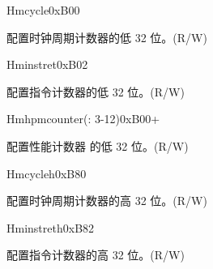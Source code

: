 \begin{register}{H}{mcycle}{0xB00}\label{regdesc:LPMCYCLE}
%
\regnewline%
\begin{regdesc}\begin{reglist}
\label{fielddesc:LPMCYCLE}\item [MCYCLE] 配置时钟周期计数器的低 32 位。(R/W)
\end{reglist}\end{regdesc}
\end{register}

\begin{register}{H}{minstret}{0xB02}\label{regdesc:LPMINSTRET}
%
\regnewline%
\begin{regdesc}\begin{reglist}
\label{fielddesc:LPMINSTRET}\item [MINSTRET] 配置指令计数器的低 32 位。(R/W)
\end{reglist}\end{regdesc}
\end{register}


\begin{register}{H}{mhpmcounter(: 3-12)}{0xB00+}\label{regdesc:LPMHPMCOUNTER}
%
\regnewline%
\begin{regdesc}\begin{reglist}
\label{fielddesc:LPMHMPCOUNTER}\item [MHPMCOUNTER\regindex{n}] 配置性能计数器  的低 32 位。(R/W)
\end{reglist}\end{regdesc}
\end{register}


\begin{register}{H}{mcycleh}{0xB80}\label{regdesc:LPMCYCLEH}
%
\regnewline%
\begin{regdesc}\begin{reglist}
\label{fielddesc:LPMCYCLEH}\item [MCYCLEH] 配置时钟周期计数器的高 32 位。(R/W)
\end{reglist}\end{regdesc}
\end{register}

\begin{register}{H}{minstreth}{0xB82}\label{regdesc:LPMINSTRETH}
%
\regnewline%
\begin{regdesc}\begin{reglist}
\label{fielddesc:LPMINSTRETH}\item [MINSTRETH] 配置指令计数器的高 32 位。(R/W)
\end{reglist}\end{regdesc}
\end{register}


